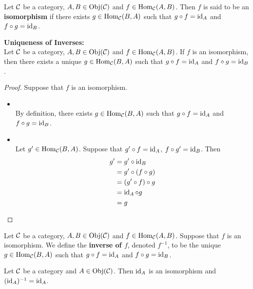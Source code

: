 \documentclass{book}
\begin{document}
	\begin{defn} 
		Let $\mathcal{C}$ be a category, $A,B \in \operatorname{Obj}(\mathcal{C})$ and $f \in \operatorname{Hom}_{\mathcal{C}}(A, B)$. Then $f$ is said to be an \textbf{isomorphism} if there exists $g \in \operatorname{Hom}_{\mathcal{C}}(B, A)$ such that $g \circ f = \operatorname{id}_{A}$ and $f \circ g = \operatorname{id}_{B}$. 
	\end{defn}
	
	\begin{ex}  \textbf{Uniqueness of Inverses:} \\
		Let $\mathcal{C}$ be a category, $A,B \in \operatorname{Obj}(\mathcal{C})$ and $f \in \operatorname{Hom}_{\mathcal{C}}(A, B)$. If $f$ is an isomorphism, then there exists a unique $g \in \operatorname{Hom}_{\mathcal{C}}(B, A)$ such that $g \circ f = \operatorname{id}_A$ and $f \circ g = \operatorname{id}_B$.
	\end{ex}
	
	\begin{proof}
		Suppose that $f$ is an isomorphism. 
		\begin{itemize}
			\item {} \\
			By definition, there exists $g \in \operatorname{Hom}_{\mathcal{C}}(B, A)$ such that $g \circ f = \operatorname{id}_{A}$ and $f \circ g = \operatorname{id}_B$.
			\item {} \\
			Let $g' \in \operatorname{Hom}_{\mathcal{C}}(B, A)$. Suppose that $g' \circ f = \operatorname{id}_A$, $f \circ g' = \operatorname{id}_B$. Then 
			\begin{align*}
				g'
				& = g' \circ \operatorname{id}_{B} \\
				& = g' \circ (f \circ g) \\
				& = (g' \circ f) \circ  g \\
				& = \operatorname{id}_A \circ g \\
				& = g
			\end{align*}
		\end{itemize}
	\end{proof}

	\begin{defn} 
		Let $\mathcal{C}$ be a category, $A,B \in \operatorname{Obj}(\mathcal{C})$ and $f \in \operatorname{Hom}_{\mathcal{C}}(A, B)$. Suppose that $f$ is an isomorphism. We define the \textbf{inverse of $f$}, denoted $f^{-1}$, to be the unique $g \in \operatorname{Hom}_{\mathcal{C}}(B, A)$ such that $g \circ f = \operatorname{id}_A$ and $f \circ g = \operatorname{id}_B$.
	\end{defn}
	
	\begin{ex} 
		Let $\mathcal{C}$ be a category and $A \in \operatorname{Obj}(\mathcal{C})$. Then $\operatorname{id}_A$ is an isomorphism and $(\operatorname{id}_A)^{-1} = \operatorname{id}_A$. 
	\end{ex}
	
\end{document}
